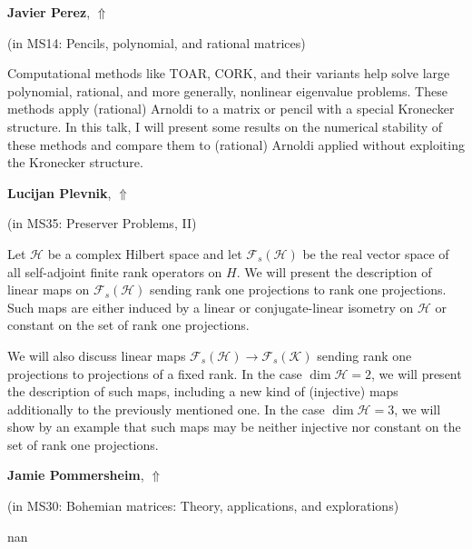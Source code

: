 \documentclass[ILAS2025-program.tex]{subfiles}
\begin{document}
\hypertarget{down0328}{}\begin{ilasabstract}
    
\textbf{Javier Perez},  \hfill \hyperlink{up0328}{$\Uparrow$}
    
    
(in {\color{mstitle}MS14: Pencils, polynomial, and rational matrices})
        
\mtskip
    Computational methods like TOAR, CORK, and their variants help solve large polynomial, rational, and more generally, nonlinear eigenvalue problems. 
These methods apply (rational) Arnoldi to a matrix or pencil with a special Kronecker structure.
In this talk, I will present some results on the numerical stability of these methods and compare them to  (rational) Arnoldi applied without exploiting the Kronecker structure.
\end{ilasabstract}
    

\hypertarget{down0280}{}\begin{ilasabstract}
    
\textbf{Lucijan Plevnik},  \hfill \hyperlink{up0280}{$\Uparrow$}
    
    
(in {\color{mstitle}MS35: Preserver Problems, II})
        
\mtskip
    Let $\mathcal H$ be a complex Hilbert space and let ${\mathcal F}_{s}(\mathcal H)$ be the real vector space of all self-adjoint finite rank operators on $H$.
We will present the description of linear maps on ${\mathcal F}_{s}(\mathcal H)$ sending rank one projections to rank one projections.
Such maps are either induced by a linear or conjugate-linear isometry on $\mathcal H$ or constant on the set of rank one projections.

We will also discuss linear maps ${\mathcal F}_{s}(\mathcal H) \to {\mathcal F}_{s}(\mathcal K)$ sending rank one projections to projections of a fixed rank.
In the case $\dim \mathcal H = 2$, we will present the description of such maps, including a new kind of (injective) maps additionally to the previously mentioned one.
In the case $\dim \mathcal H = 3$, we will show by an example that such maps may be neither injective nor constant on the set of rank one projections.

\end{ilasabstract}
    

\hypertarget{down0229}{}\begin{ilasabstract}
    
\textbf{Jamie Pommersheim},  \hfill \hyperlink{up0229}{$\Uparrow$}
    
    
(in {\color{mstitle}MS30: Bohemian matrices: Theory, applications, and explorations})
        
\mtskip
    nan
\end{ilasabstract}
    
\end{document}
